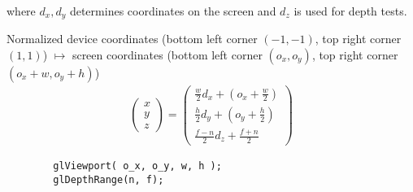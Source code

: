 \begin{compactdesc}
\begin{gather*}
	\end{gather*}
		where $d_x,d_y$ determines coordinates on the screen and $d_z$ is used for depth tests.
	\item[\lp{Viewport Transform}]
		Normalized device coordinates (bottom left corner $(-1,-1)$, top right corner $(1,1)$) $\mapsto$ screen coordinates (bottom left corner $(o_x,o_y)$, top right corner $(o_x+w,o_y+h)$)
		\begin{gather*}
			\!\left(\!\begin{smallmatrix}
				x\\
				y\\
				z
			\end{smallmatrix}\!\right)\!
			=
			\!\left(\!\begin{smallmatrix}
				\frac{w}{2}d_x+\left( o_x+\frac{w}{2} \right)\\
				\frac{h}{2}d_y+\left( o_y+\frac{h}{2} \right)\\
				\frac{f-n}{2}d_z+\frac{f+n}{2}
			\end{smallmatrix}\!\right)\!
		\end{gather*}
		\begin{lstlisting}
		glViewport( o_x, o_y, w, h );
		glDepthRange(n, f);
		\end{lstlisting}
\end{compactdesc}
